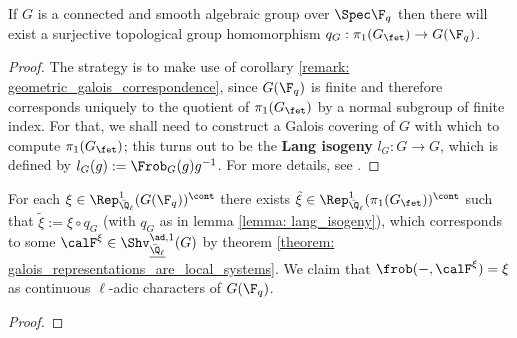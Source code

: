         \begin{lemma} \label{lemma: lang_isogeny}
            If $G$ is a connected and smooth algebraic group over $\Spec \F_q$ then there will exist a surjective topological group homomorphism $q_G: \pi_1(G_{\fet}) \to G(\F_q)$.
        \end{lemma}
            \begin{proof}
                The strategy is to make use of corollary \ref{remark: geometric_galois_correspondence}, since $G(\F_q)$ is finite and therefore corresponds uniquely to the quotient of $\pi_1(G_{\fet})$ by a normal subgroup of finite index. For that, we shall need to construct a Galois covering of $G$ with which to compute $\pi_1(G_{\fet})$; this turns out to be the \textbf{Lang isogeny} $l_G: G \to G$, which is defined by $l_G(g) := \Frob_G(g)g^{-1}$. For more details, see \cite[Theorem 4.4.17]{springer_linear_algebraic_groups}.
            \end{proof}
        \begin{proposition} \label{prop: sheaf_function_correspondence}
            For each $\xi \in \Rep^1_{\bar{\Q}_{\ell}}(G(\F_q))^{\cont}$ there exists $\tilde{\xi} \in \Rep^1_{\bar{\Q}_{\ell}}(\pi_1(G_{\fet}))^{\cont}$ such that $\tilde{\xi} := \xi \circ q_G$ (with $q_G$ as in lemma \ref{lemma: lang_isogeny}), which corresponds to some $\calF^{\xi} \in \Shv_{\underline{\bar{\Q}_{\ell}}}^{\ad, 1}(G)$ by theorem \ref{theorem: galois_representations_are_local_systems}. We claim that $\frob(-, \calF^{\xi}) = \xi$ as continuous $\ell$-adic characters of $G(\F_q)$.
        \end{proposition}
            \begin{proof}
                
            \end{proof}
